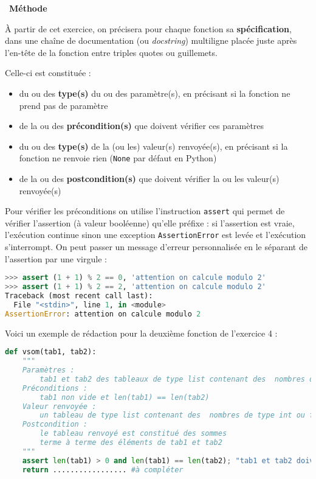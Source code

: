 \documentclass[
  10pt,
]{article}
\newcommand{\passthrough}[1]{#1}
\providecommand{\tightlist}{%
  \setlength{\itemsep}{0pt}\setlength{\parskip}{0pt}}
\newcounter{def}
\newenvironment{methode}[1]
{\par \medskip    \noindent  
 \begin {bclogo}[arrondi =0.1,logo=\bcoutil, marge=4,noborder = true] {~\textbf{Méthode}   {\itshape #1} }  \par}
{
\end{bclogo}
 \par \bigskip }
\begin{document}
\begin{methode}{}

À partir de cet exercice, on précisera pour chaque fonction sa
\textbf{spécification}, dans une chaîne de documentation (ou
\emph{docstring}) multiligne placée juste après l'en-tête de la fonction
entre triples quotes ou guillemets.

Celle-ci est constituée :

\begin{itemize}
\tightlist
\item
  du ou des \textbf{type(s)} du ou des paramètre(s), en précisant si la
  fonction ne prend pas de paramètre
\item
  de la ou des \textbf{précondition(s)} que doivent vérifier ces
  paramètres
\item
  du ou des \textbf{type(s)} de la (ou les) valeur(s) renvoyée(s), en
  précisant si la fonction ne renvoie rien
  (\passthrough{\lstinline!None!} par défaut en Python)
\item
  de la ou des \textbf{postcondition(s)} que doivent vérifier la ou les
  valeur(s) renvoyée(s)
\end{itemize}

Pour vérifier les préconditions on utilise l'instruction
\passthrough{\lstinline!assert!} qui permet de vérifier l'assertion (à
valeur booléenne) qu'elle préfixe : si l'assertion est vraie,
l'exécution continue sinon une exception
\passthrough{\lstinline!AssertionError!} est levée et l'exécution
s'interrompt. On peut passer un message d'erreur personnalisée en le
séparant de l'assertion par une virgule :

\begin{lstlisting}[language=Python]
>>> assert (1 + 1) % 2 == 0, 'attention on calcule modulo 2'
>>> assert (1 + 1) % 2 == 2, 'attention on calcule modulo 2'
Traceback (most recent call last):
  File "<stdin>", line 1, in <module>
AssertionError: attention on calcule modulo 2
\end{lstlisting}

Voici un exemple de rédaction pour la deuxième fonction de l'exercice 4
:

\begin{lstlisting}[language=Python]
def vsom(tab1, tab2):
    """
    Paramètres :
        tab1 et tab2 des tableaux de type list contenant des  nombres de type int ou float
    Préconditions :
        tab1 non vide et len(tab1) == len(tab2)
    Valeur renvoyée :
        un tableau de type list contenant des  nombres de type int ou float
    Postcondition :
        le tableau renvoyé est constitué des sommes
        terme à terme des éléments de tab1 et tab2        
    """
    assert len(tab1) > 0 and len(tab1) == len(tab2); "tab1 et tab2 doivent être de même longueur"
    return ................. #à compléter
\end{lstlisting}

\end{methode}
\end{document}
